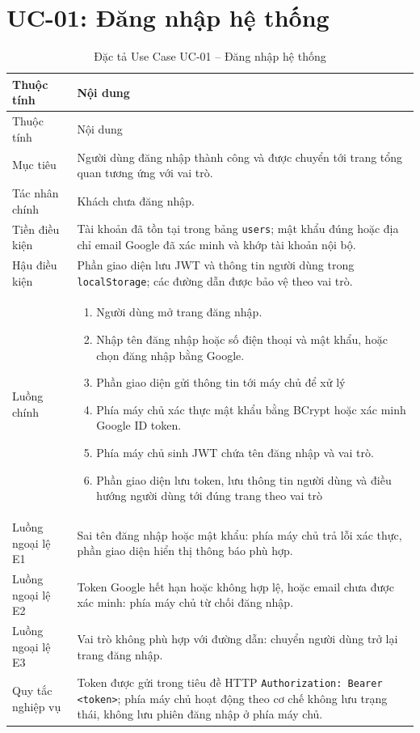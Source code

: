 ﻿\documentclass[12pt,a4paper]{report}
\begin{document}
\section{UC-01: Đăng nhập hệ thống}
\begin{longtable}{L{4cm} L{10.5cm}}
\caption{Đặc tả Use Case UC-01 -- Đăng nhập hệ thống}\label{tab:uc-login}\\
\toprule
Thuộc tính & Nội dung \\
\midrule
\endfirsthead
\toprule Thuộc tính & Nội dung \\\midrule
\endhead
Mục tiêu & Người dùng đăng nhập thành công và được chuyển tới trang tổng quan tương ứng với vai trò. \\
Tác nhân chính & Khách chưa đăng nhập. \\
Tiền điều kiện & Tài khoản đã tồn tại trong bảng \texttt{users}; mật khẩu đúng hoặc địa chỉ email Google đã xác minh và khớp tài khoản nội bộ. \\
Hậu điều kiện & Phần giao diện lưu JWT và thông tin người dùng trong \texttt{localStorage}; các đường dẫn được bảo vệ theo vai trò. \\
Luồng chính & \begin{enumerate}
\item Người dùng mở trang đăng nhập.
\item Nhập tên đăng nhập hoặc số điện thoại và mật khẩu, hoặc chọn đăng nhập bằng Google.
\item Phần giao diện gửi thông tin tới máy chủ để xử lý
\item Phía máy chủ xác thực mật khẩu bằng BCrypt hoặc xác minh Google ID token.
\item Phía máy chủ sinh JWT chứa tên đăng nhập và vai trò.
\item Phần giao diện lưu token, lưu thông tin người dùng và điều hướng người dùng tới đúng trang theo vai trò
\end{enumerate} \\
Luồng ngoại lệ E1 & Sai tên đăng nhập hoặc mật khẩu: phía máy chủ trả lỗi xác thực, phần giao diện hiển thị thông báo phù hợp. \\
Luồng ngoại lệ E2 & Token Google hết hạn hoặc không hợp lệ, hoặc email chưa được xác minh: phía máy chủ từ chối đăng nhập. \\
Luồng ngoại lệ E3 & Vai trò không phù hợp với đường dẫn: chuyển người dùng trở lại trang đăng nhập. \\
Quy tắc nghiệp vụ & Token được gửi trong tiêu đề HTTP \texttt{Authorization: Bearer <token>}; phía máy chủ hoạt động theo cơ chế không lưu trạng thái, không lưu phiên đăng nhập ở phía máy chủ. \\
\bottomrule
\end{longtable}
\end{document}
